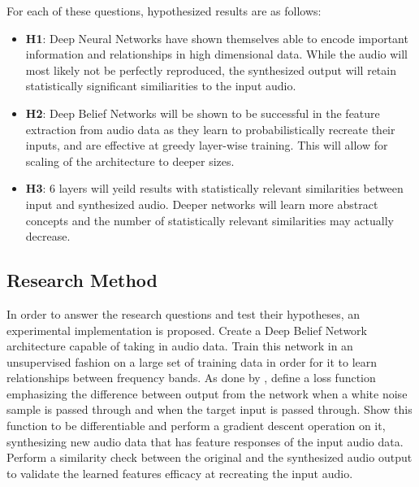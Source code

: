 \documentclass[12pt]{article}
\begin{document}
For each of these questions, hypothesized results are as follows:

\begin{itemize}
\item \textbf{H1}: Deep Neural Networks have shown themselves able to encode important information and relationships in high dimensional data. While the audio will most likely not be perfectly reproduced, the synthesized output will retain statistically significant similiarities to the input audio. 
\item \textbf{H2}: Deep Belief Networks will be shown to be successful in the feature extraction from audio data as they learn to probabilistically recreate their inputs, and are effective at greedy layer-wise training. This will allow for scaling of the architecture to deeper sizes. 
\item \textbf{H3}: 6 layers will yeild results with statistically relevant similarities between input and synthesized audio. Deeper networks will learn more abstract concepts and the number of statistically relevant similarities may actually decrease.

\end{itemize}

\subsection{Research Method}
In order to answer the research questions and test their hypotheses, an experimental implementation is proposed. Create a Deep Belief Network architecture capable of taking in audio data. Train this network in an unsupervised fashion on a large set of training data in order for it to learn relationships between frequency bands. As done by \citet{gatys2015neural}, define a loss function emphasizing the difference between output from the network when a white noise sample is passed through and when the target input is passed through. Show this function to be differentiable and perform a gradient descent operation on it, synthesizing new audio data that has feature responses of the input audio data. Perform a similarity check between the original and the synthesized audio output to validate the learned features efficacy at recreating the input audio.
\end{document}
